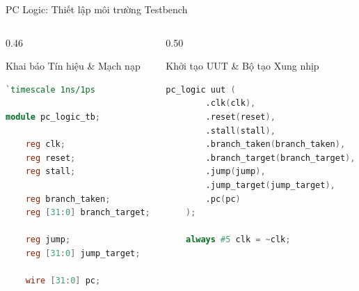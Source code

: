 \begin{frame}[fragile]{PC Logic: Thiết lập môi trường Testbench}
    \begin{columns}[t]
        \begin{column}{0.46\textwidth}
            \begin{block}{Khai báo Tín hiệu \& Mạch nạp}
                \begin{lstlisting}[language=Verilog, basicstyle=\fontsize{6.5pt}{8.0pt}\selectfont\ttfamily, keywordstyle=\color{blue}, commentstyle=\color{gray}]
`timescale 1ns/1ps

module pc_logic_tb;

    reg clk;
    reg reset;
    reg stall;

    reg branch_taken;
    reg [31:0] branch_target;

    reg jump;
    reg [31:0] jump_target;

    wire [31:0] pc;
                \end{lstlisting}
            \end{block}
        \end{column}
        
        \begin{column}{0.50\textwidth}
            \begin{block}{Khởi tạo UUT \& Bộ tạo Xung nhịp}
                \begin{lstlisting}[language=Verilog, basicstyle=\fontsize{6.5pt}{7.5pt}\selectfont\ttfamily, keywordstyle=\color{blue}, commentstyle=\color{gray}]
    pc_logic uut (
        .clk(clk),
        .reset(reset),
        .stall(stall),
        .branch_taken(branch_taken),
        .branch_target(branch_target),
        .jump(jump),
        .jump_target(jump_target),
        .pc(pc)
    );

    always #5 clk = ~clk;
                \end{lstlisting}
            \end{block}
        \end{column}
    \end{columns}
\end{frame}

